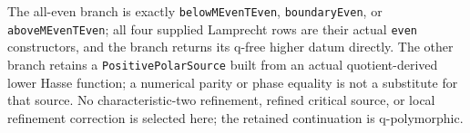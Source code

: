 \begin{theorem}
The all-even branch is exactly
\texttt{belowMEvenTEven}, \texttt{boundaryEven}, or
\texttt{aboveMEvenTEven}; all four supplied Lamprecht rows are their actual
\texttt{even} constructors, and the branch returns its q-free higher datum
directly.  The other branch retains a \texttt{PositivePolarSource} built from
an actual quotient-derived lower Hasse function; a numerical parity or phase
equality is not a substitute for that source.  No characteristic-two
refinement, refined critical source, or local refinement correction is
selected here; the retained continuation is q-polymorphic.
\end{theorem}
